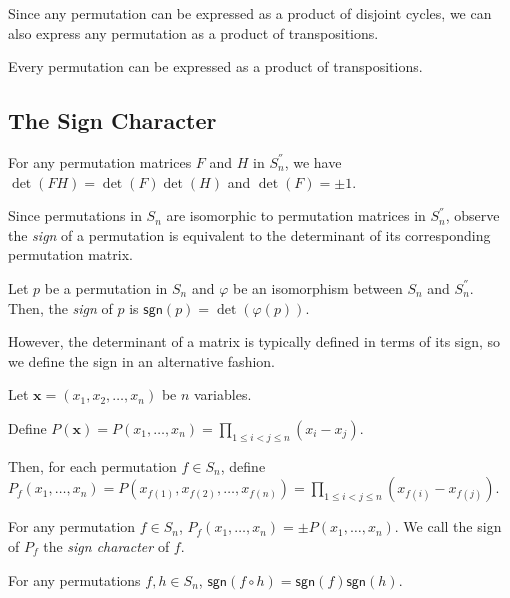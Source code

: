 \documentclass{article}
\begin{document}
Since any permutation can be expressed as a product of disjoint cycles, we can also express any permutation as a product of transpositions.

\begin{proposition}
  Every permutation can be expressed as a product of transpositions.
\end{proposition}

\subsection{The Sign Character}

\begin{lemma}
  For any permutation matrices $F$ and $H$ in $S_n^{''}$, we have $\det(FH) = \det(F)\det(H)$ and $\det(F) = \pm 1$.
\end{lemma}

Since permutations in $S_n$ are isomorphic to permutation matrices in $S_n^{''}$, observe the \emph{sign} of a permutation is equivalent to the determinant of its corresponding permutation matrix.

\begin{example}
  Let $p$ be a permutation in $S_n$ and $\varphi$ be an isomorphism between $S_n$ and $S_n^{''}$. Then, the \emph{sign} of $p$ is $\mathsf{sgn}(p) = \det(\varphi(p))$.
\end{example}

However, the determinant of a matrix is typically defined in terms of its sign, so we define the sign in an alternative fashion.

\begin{definition}
  Let $\mathbf{x} = (x_1, x_2, \ldots, x_n)$ be $n$ variables.
  
  Define $P(\mathbf{x}) = P(x_1, \ldots, x_n) = \prod\limits_{1 \le i < j \le n}(x_i - x_j)$.
  
  Then, for each permutation $f \in S_n$, define $P_f(x_1, \ldots, x_n) = P(x_{f(1)}, x_{f(2)}, \ldots, x_{f(n)}) = \prod\limits_{1 \le i < j \le n}(x_{f(i)} - x_{f(j)})$.
\end{definition}

\begin{proposition}
  For any permutation $f \in S_n$, $P_f(x_1, \ldots, x_n) = \pm P(x_1, \ldots, x_n)$. We call the sign of $P_f$ the \emph{sign character} of $f$.
\end{proposition}

\begin{proposition}
  For any permutations $f, h \in S_n$, $\mathsf{sgn}(f \circ h) = \mathsf{sgn}(f) \mathsf{sgn}(h)$.
\end{proposition}
\end{document}
